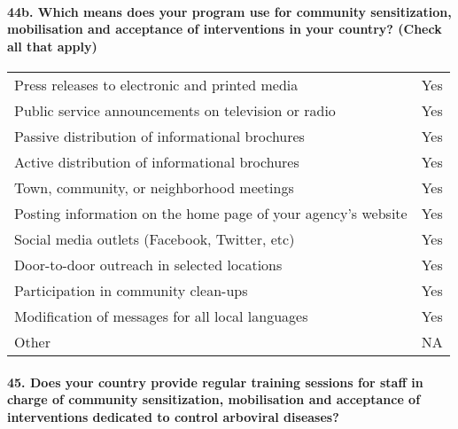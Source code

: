\documentclass[
]{article}
\begin{document}
\hypertarget{b.-which-means-does-your-program-use-for-community-sensitization-mobilisation-and-acceptance-of-interventions-in-your-country-check-all-that-apply}{%
\paragraph{44b. Which means does your program use for community
sensitization, mobilisation and acceptance of interventions in your
country? (Check all that
apply)}\label{b.-which-means-does-your-program-use-for-community-sensitization-mobilisation-and-acceptance-of-interventions-in-your-country-check-all-that-apply}}

\begin{longtable}[]{@{}ll@{}}
\toprule
\endhead
Press releases to electronic and printed media & Yes \\
Public service announcements on television or radio & Yes \\
Passive distribution of informational brochures & Yes \\
Active distribution of informational brochures & Yes \\
Town, community, or neighborhood meetings & Yes \\
Posting information on the home page of your agency's website & Yes \\
Social media outlets (Facebook, Twitter, etc) & Yes \\
Door-to-door outreach in selected locations & Yes \\
Participation in community clean-ups & Yes \\
Modification of messages for all local languages & Yes \\
Other & NA \\
\bottomrule
\end{longtable}

\hypertarget{does-your-country-provide-regular-training-sessions-for-staff-in-charge-of-community-sensitization-mobilisation-and-acceptance-of-interventions-dedicated-to-control-arboviral-diseases}{%
\paragraph{45. Does your country provide regular training sessions for
staff in charge of community sensitization, mobilisation and acceptance
of interventions dedicated to control arboviral
diseases?}\label{does-your-country-provide-regular-training-sessions-for-staff-in-charge-of-community-sensitization-mobilisation-and-acceptance-of-interventions-dedicated-to-control-arboviral-diseases}}
\end{document}
